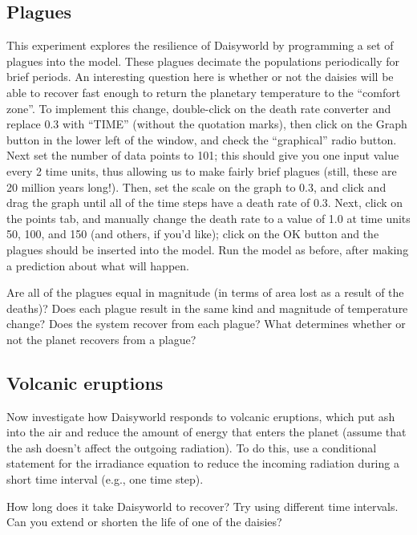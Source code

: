 \documentclass[11pt,letterpaper]{article}
\begin{document}
\subsection{Plagues}
This experiment explores the resilience of Daisyworld by programming a set of plagues into the model. These plagues decimate the
populations periodically for brief periods. An interesting question here is whether or not the daisies will be able to recover fast
enough to return the planetary temperature to the ``comfort zone''. To implement this change, double-click on the death rate
converter and replace 0.3 with ``TIME'' (without the quotation marks), then click on the Graph button in the lower left of the
window, and check the ``graphical'' radio button. Next set the number of data points to 101; this should give you one input value every 2 time units, thus allowing us to make fairly brief plagues (still, these are 20 million years long!). Then, set the scale on the graph to 0.3, and click and drag the graph until all of the time steps have a death rate of 0.3. Next, click on the points tab, and manually change the death rate to a value of 1.0 at time units 50, 100, and 150 (and others, if you'd like); click on the OK button and the plagues should be inserted into the model. Run the model as before, after making a prediction about what will happen. 

Are all of the plagues equal in magnitude (in terms of area lost as a result of the deaths)? Does each plague result in the same kind and magnitude of temperature change? Does the system recover from each plague? What determines whether or not the planet recovers from a plague?

\subsection{Volcanic eruptions}
Now investigate how Daisyworld responds to volcanic eruptions, which put ash into the air and reduce the amount of energy that enters the planet (assume that the ash doesn't affect the outgoing radiation). To do this, use a conditional statement for the irradiance equation to reduce the incoming radiation during a short time interval (e.g., one time step). 

How long does it take Daisyworld to recover? Try using different time intervals. Can you extend or shorten the life of one of the daisies?
\end{document}
